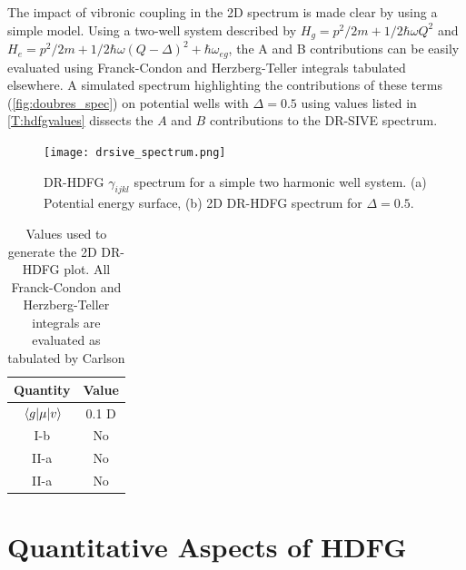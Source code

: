 \documentclass[aip, jcp, reprint, onecolumn]{revtex4-2}
\begin{document}
The impact of vibronic coupling in the 2D spectrum is made clear by using a simple model.
Using a two-well system described by $H_g = p^2/2m + 1/2 \hbar \omega Q^2$ and $H_e = p^2/2m + 1/2 \hbar \omega (Q-\Delta)^2 +\hbar \omega_{eg}$, the A and B contributions can be easily evaluated using Franck-Condon and Herzberg-Teller integrals tabulated elsewhere. \cite{Carlson1988thesis} 
A simulated spectrum highlighting the contributions of these terms (\autoref{fig:doubres_spec}) on potential wells with $\Delta = 0.5$ using values listed in \autoref{T:hdfgvalues} dissects the $A$ and $B$ contributions to the DR-SIVE spectrum.

\begin{figure}[!htbp]
	\centering
	\texttt{[image: drsive\_spectrum.png]}
	\caption{DR-HDFG $\gamma_{ijkl}$ spectrum for a simple two harmonic well system.
		(a) Potential energy surface, (b) 2D DR-HDFG spectrum for $\Delta = 0.5$.}
	\label{fig:doubres_spec}
\end{figure}

\begin{table}[!htbp]
	\caption{\label{T:hdfgvalues} Values used to generate the 2D DR-HDFG plot. 
	All Franck-Condon and Herzberg-Teller integrals are evaluated as tabulated by Carlson \cite{Carlson1988thesis}}
	\begin{ruledtabular}
		\begin{tabular}{cc}
			Quantity & Value\\
			\hline  
			$\mel{g}{\mu}{v}$ & 0.1 D\\
			I-b & No\\
			II-a & No\\
			II-a & No\\
		\end{tabular}
	\end{ruledtabular}
\end{table}

\section{Quantitative Aspects of HDFG}\label{quant}
\end{document}
